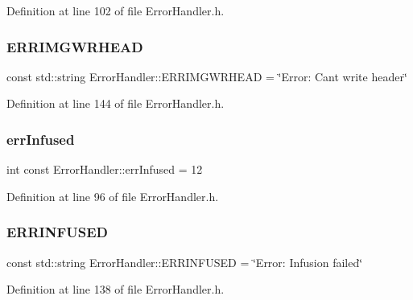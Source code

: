 Definition at line 102 of file Error\+Handler.\+h.

\mbox{\label{classErrorHandler_aaacdfc33d32a1f97a8a2704512fa4436}} 
\subsubsection{\texorpdfstring{ERRIMGWRHEAD}{ERRIMGWRHEAD}}
{\footnotesize\ttfamily const std\+::string Error\+Handler\+::\+E\+R\+R\+I\+M\+G\+W\+R\+H\+E\+AD = \char`\"{}Error\+: Can\textquotesingle{}t write header\char`\"{}\hspace{0.3cm}{\ttfamily [static]}}



Definition at line 144 of file Error\+Handler.\+h.

\mbox{\label{classErrorHandler_a6b02e9a761607b206e3b6f724d03ac29}} 
\subsubsection{\texorpdfstring{errInfused}{errInfused}}
{\footnotesize\ttfamily int const Error\+Handler\+::err\+Infused = 12\hspace{0.3cm}{\ttfamily [static]}}



Definition at line 96 of file Error\+Handler.\+h.

\mbox{\label{classErrorHandler_a8ee302ac7c97c484eb90c8e08fad3749}} 
\subsubsection{\texorpdfstring{ERRINFUSED}{ERRINFUSED}}
{\footnotesize\ttfamily const std\+::string Error\+Handler\+::\+E\+R\+R\+I\+N\+F\+U\+S\+ED = \char`\"{}Error\+: Infusion failed\char`\"{}\hspace{0.3cm}{\ttfamily [static]}}



Definition at line 138 of file Error\+Handler.\+h.


